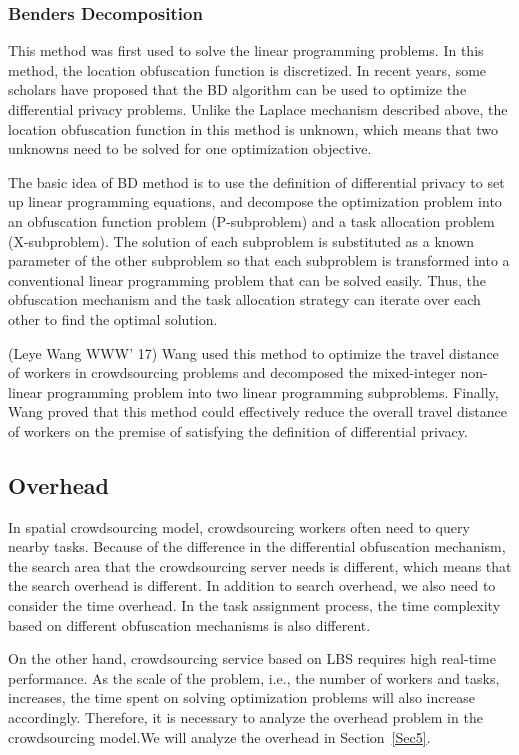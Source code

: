 \subsubsection{Benders Decomposition}
This method was first used to solve the linear programming problems. In this method, the location obfuscation function is discretized. In recent years, some scholars have proposed that the BD algorithm can be used to optimize the differential privacy problems. Unlike the Laplace mechanism described above, the location obfuscation function in this method is unknown, which means that two unknowns need to be solved for one optimization objective.

The basic idea of BD method is to use the definition of differential privacy to set up linear programming equations, and decompose the optimization problem into an obfuscation function problem (P-subproblem) and a task allocation problem (X-subproblem). The solution of each subproblem is substituted as a known parameter of the other subproblem so that each subproblem is transformed into a conventional linear programming problem that can be solved easily. Thus, the obfuscation mechanism and the task allocation strategy can iterate over each other to find the optimal solution.

(Leye Wang WWW' 17) Wang used this method to optimize the travel distance of workers in crowdsourcing problems and decomposed the mixed-integer non-linear programming problem into two linear programming subproblems. Finally, Wang proved that this method could effectively reduce the overall travel distance of workers on the premise of satisfying the definition of differential privacy.

\subsection{Overhead} %
In spatial crowdsourcing model, crowdsourcing workers often need to query nearby tasks. Because of the difference in the differential obfuscation mechanism, the search area that the crowdsourcing server needs is different, which means that the search overhead is different. In addition to search overhead, we also need to consider the time overhead. In the task assignment process, the time complexity based on different obfuscation mechanisms is also different.

On the other hand, crowdsourcing service based on LBS requires high real-time performance. As the scale of the problem, i.e., the number of workers and tasks, increases, the time spent on solving optimization problems will also increase accordingly. Therefore, it is necessary to analyze the overhead problem in the crowdsourcing model.We will analyze the overhead in Section~\ref{Sec5}.

